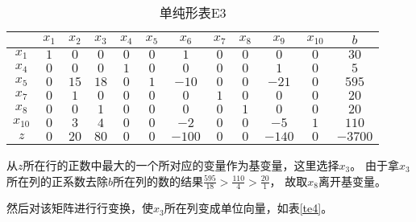 \begin{solution}
     \begin{table}[!h]
        \centering
        \caption{单纯形表E3}
        \label{te3}
        \begin{tabular}{c|ccccccccccc} 
        \toprule
                 &$x_1$  &$x_2$  &$x_3$  &$x_4$  &$x_5$  &$x_6$  &$x_7$  &$x_8$  &$x_9$  &$x_{10}$ &$b$    \\\hline
        $x_1$    &$1$    &$0$    &$0$    &$0$    &$0$    &$1$    &$0$    &$0$    &$0$    &$0$      &$30$   \\
        $x_4$    &$0$    &$0$    &$0$    &$1$    &$0$    &$0$    &$0$    &$0$    &$1$    &$0$      &$5$    \\
        $x_5$    &$0$    &$15$   &$18$   &$0$    &$1$    &$-10$  &$0$    &$0$    &$-21$  &$0$      &$595$  \\
        $x_7$    &$0$    &$1$    &$0$    &$0$    &$0$    &$0$    &$1$    &$0$    &$0$    &$0$      &$20$   \\
        $x_8$    &$0$    &$0$    &$1$    &$0$    &$0$    &$0$    &$0$    &$1$    &$0$    &$0$      &$20$   \\
        $x_{10}$ &$0$    &$3$    &$4$    &$0$    &$0$    &$-2$   &$0$    &$0$    &$-5$   &$1$      &$110$  \\
        $z$      &$0$    &$20$   &$80$   &$0$    &$0$    &$-100$ &$0$    &$0$    &$-140$ &$0$      &$-3700$ \\
        \bottomrule
        \end{tabular}
     \end{table}

     从$z$所在行的正数中最大的一个所对应的变量作为基变量，这里选择$x_3$。
     由于拿$x_3$所在列的正系数去除$b$所在列的数的结果$\frac{595}{18}>\frac{110}{4}>\frac{20}{1}$，
     故取$x_{8}$离开基变量。

    然后对该矩阵进行行变换，使$x_3$所在列变成单位向量，如表\ref{te4}。


\end{solution}
